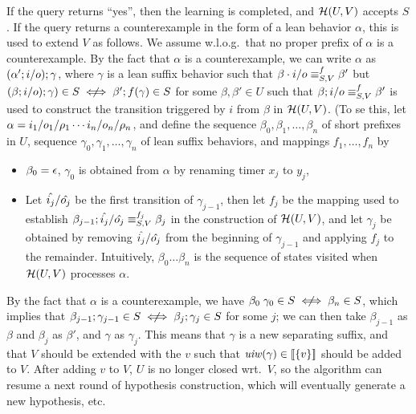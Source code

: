 If the query returns ``yes'', then
the learning is completed, and $\mathcal{H}(U,V)$ accepts $S$.
If the query returns a counterexample in the form of a lean behavior
$\alpha$, this is used to extend $V$ as follows.
We assume w.l.o.g.\ that no proper prefix of $\alpha$ is a counterexample. 
By the fact that $\alpha$ is a counterexample, we can write $\alpha$ as
$(\alpha';i/o); \gamma$, where $\gamma$ is a lean suffix
behavior such that
$\beta\cdot i/o \equiv_{S,V}^f \beta'$ but
$(\beta ; \simpleutlabel{i}{o}) ; \gamma) \in S \notiff \beta' ; f(\gamma) \in S$ for some $\beta,\beta' \in U$ such that 
$\beta;i/o \equiv_{S,V}^f \beta'$ is used to construct
the transition triggered by $i$ from $\beta$ in $\mathcal{H}(U,V)$.
(To se this, let $\alpha = i_1/o_1/\rho_1 \cdots i_n/o_n/\rho_n$, and
define the sequence $\beta_0, \beta_1, \ldots ,\beta_{n}$ of short prefixes
in $U$,
sequence $\gamma_0, \gamma_1, \ldots, \gamma_n$ of lean suffix behaviors,
and mappings $f_1, \ldots , f_n$ by
\begin{itemize}
\item $\beta_0 = \epsilon$,
  $\gamma_0$ is obtained from $\alpha$ by renaming timer $x_j$ to $y_j$,
\item
  Let $\hat{i_j}/\hat{o_j}$ be the first transition of
  $\gamma_{j-1}$, then let $f_j$ be the mapping used to establish
  $\beta_{j-1};\hat{i_j}/\hat{o_j} \equiv_{S,V}^{f_j} \beta_{j}$
  in the construction of $\mathcal{H}(U,V)$, and let
  $\gamma_j$ be obtained by removing $\hat{i_j}/\hat{o_j}$
  from the beginning of $\gamma_{j-1}$ and applying $f_j$ to the remainder.
Intuitively, $\beta_0 \ldots \beta_n$ is the sequence of states
visited when $\mathcal{H}(U,V)$ processes $\alpha$.
\end{itemize}
By the fact that $\alpha$ is a counterexample, we have
$\beta_0\;\gamma_0 \in S \notiff  \beta_{n} \in S$, which implies that
$\beta_{j-1};\gamma_{j-1} \in S \notiff \beta_j;\gamma_j \in S$
for some $j$;
we can then take $\beta_{j-1}$ as $\beta$ and $\beta_j$ as $\beta'$, and
$\gamma$ as $\gamma_j$.
This means that $\gamma$ is a new separating suffix, and that $V$ should be
extended with the $v$ such that
$\mathit{uiw}(\gamma) \in [\![ \lbrace v\rbrace ] \! ]$
should be added to
$V$. After adding $v$ to $V$, $U$ is no longer closed
wrt.\ $V$, so the algorithm can resume a next round of
hypothesis construction, which will eventually generate a new hypothesis,
etc.


